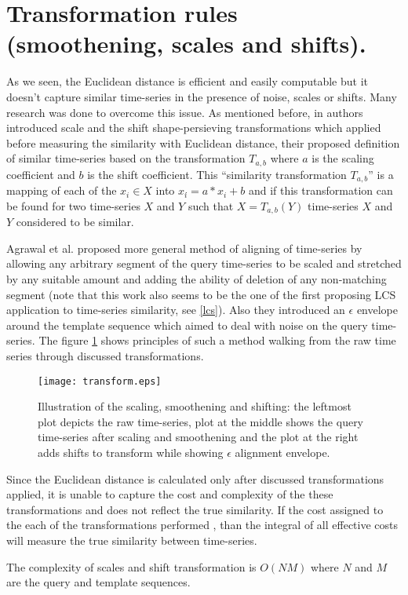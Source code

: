 \section{Transformation rules (smoothening, scales and shifts).} \label{scales_and_shifts}
As we seen, the Euclidean distance is efficient and easily computable but it doesn't capture similar time-series in the presence of noise, scales or shifts. Many research was done to overcome this issue. As mentioned before, in \cite{citeulike:3815880} authors introduced scale and the shift shape-persieving transformations which applied before measuring the similarity with Euclidean distance, their proposed definition of similar time-series based on the transformation $T_{a,b}$ where $a$ is the scaling coefficient and $b$ is the shift coefficient. This ``similarity transformation $T_{a,b}$'' is a mapping of each of the $x_{i} \in X$ into $x_{i}\acute{} = a*x_{i}+b$ and if this transformation can be found for two time-series $X$ and $Y$ such that $X=T_{a,b}(Y)$ time-series $X$ and $Y$ considered to be similar.

Agrawal et al. \cite{citeulike:3816327} proposed more general method of aligning of time-series by allowing any arbitrary segment of the query time-series to be scaled and stretched by any suitable amount and adding the ability of deletion of any non-matching segment (note that this work also seems to be the one of the first proposing LCS application to time-series similarity, see \ref{lcs}). Also they introduced an $\epsilon$ envelope around the template sequence which aimed to deal with noise on the query time-series. The figure  \ref{fig:transform} shows principles of such a method walking from the raw time series through discussed transformations.

\begin{figure}[tbp]
   \centering
   \texttt{[image: transform.eps]}
   \caption{Illustration of the scaling, smoothening and shifting: the leftmost plot depicts the raw time-series, plot at the middle shows the query time-series after scaling and smoothening and the plot at the right adds shifts to transform while showing $\epsilon$ alignment envelope.}
   \label{fig:transform}
\end{figure} 

Since the Euclidean distance is calculated only after discussed transformations applied, it is unable to capture the cost and complexity of the these transformations and does not reflect the true similarity. If the cost assigned to the each of the transformations performed \cite{citeulike:3731711}, than the integral of all effective costs will measure the true similarity between time-series.

The complexity of scales and shift transformation is $O(NM)$ where $N$ and $M$ are the query and template sequences.


